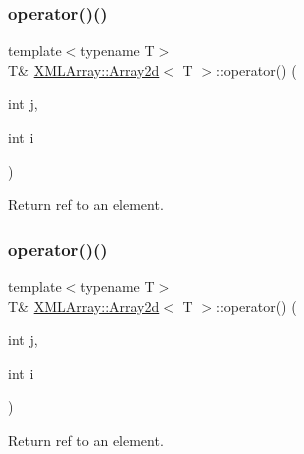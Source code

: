 \subsubsection{\texorpdfstring{operator()()}{operator()()}\hspace{0.1cm}{\footnotesize\ttfamily [2/6]}}
{\footnotesize\ttfamily template$<$typename T$>$ \\
T\& \mbox{\hyperlink{classXMLArray_1_1Array2d}{X\+M\+L\+Array\+::\+Array2d}}$<$ T $>$\+::operator() (\begin{DoxyParamCaption}\item[{int}]{j,  }\item[{int}]{i }\end{DoxyParamCaption})\hspace{0.3cm}{\ttfamily [inline]}}



Return ref to an element. 

\mbox{\label{classXMLArray_1_1Array2d_ab8618dbef1cc6b94b3345ce3da0ad996}} 
\subsubsection{\texorpdfstring{operator()()}{operator()()}\hspace{0.1cm}{\footnotesize\ttfamily [3/6]}}
{\footnotesize\ttfamily template$<$typename T$>$ \\
T\& \mbox{\hyperlink{classXMLArray_1_1Array2d}{X\+M\+L\+Array\+::\+Array2d}}$<$ T $>$\+::operator() (\begin{DoxyParamCaption}\item[{int}]{j,  }\item[{int}]{i }\end{DoxyParamCaption})\hspace{0.3cm}{\ttfamily [inline]}}



Return ref to an element. 

\mbox{\label{classXMLArray_1_1Array2d_aa02dc8ee58bd33aca0cfbbf58cbf1ba7}} 
